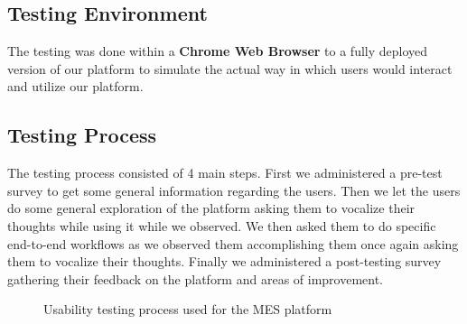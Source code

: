 \documentclass[12pt]{article}
\begin{document}
\subsection{Testing Environment}
The testing was done within a \textbf{Chrome Web Browser} to a fully deployed version of our platform to simulate the actual way in which users would interact and utilize our platform.

\subsection{Testing Process}
The testing process consisted of 4 main steps. First we administered a pre-test survey to get some general information regarding the users. Then we let the users do some general exploration of the platform asking them to vocalize their thoughts while using it while we observed. We then asked them to do specific end-to-end workflows as we observed them accomplishing them once again asking them to vocalize their thoughts. Finally we administered a post-testing survey gathering their feedback on the platform and areas of improvement.

\begin{figure}[H]
\centering
\setlength{\fboxsep}{8pt}
\caption{Usability testing process used for the MES platform}
\label{fig:usability-testing-process}
\end{figure}
\end{document}

